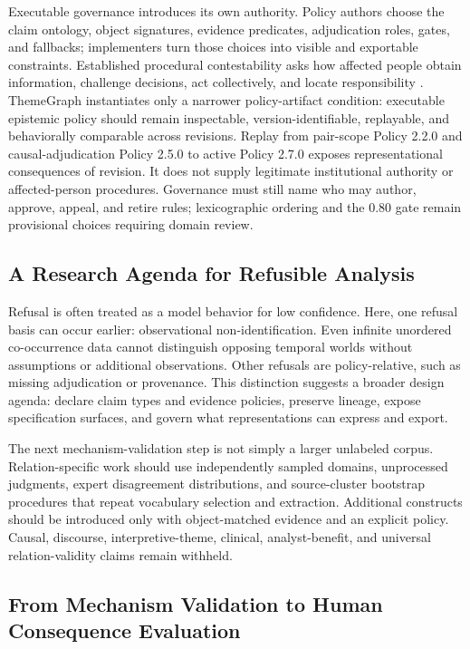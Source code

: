 \documentclass[manuscript,screen,review]{acmart}
\begin{document}
Executable governance introduces its own authority. Policy authors choose the claim ontology, object signatures, evidence predicates, adjudication roles, gates, and fallbacks; implementers turn those choices into visible and exportable constraints. Established procedural contestability asks how affected people obtain information, challenge decisions, act collectively, and locate responsibility \cite{yurrita2025}. ThemeGraph instantiates only a narrower policy-artifact condition: executable epistemic policy should remain inspectable, version-identifiable, replayable, and behaviorally comparable across revisions. Replay from pair-scope Policy 2.2.0 and causal-adjudication Policy 2.5.0 to active Policy 2.7.0 exposes representational consequences of revision. It does not supply legitimate institutional authority or affected-person procedures. Governance must still name who may author, approve, appeal, and retire rules; lexicographic ordering and the 0.80 gate remain provisional choices requiring domain review.

\subsection{A Research Agenda for Refusible Analysis}

Refusal is often treated as a model behavior for low confidence. Here, one refusal basis can occur earlier: observational non-identification. Even infinite unordered co-occurrence data cannot distinguish opposing temporal worlds without assumptions or additional observations. Other refusals are policy-relative, such as missing adjudication or provenance. This distinction suggests a broader design agenda: declare claim types and evidence policies, preserve lineage, expose specification surfaces, and govern what representations can express and export.

The next mechanism-validation step is not simply a larger unlabeled corpus. Relation-specific work should use independently sampled domains, unprocessed judgments, expert disagreement distributions, and source-cluster bootstrap procedures that repeat vocabulary selection and extraction. Additional constructs should be introduced only with object-matched evidence and an explicit policy. Causal, discourse, interpretive-theme, clinical, analyst-benefit, and universal relation-validity claims remain withheld.

\subsection{From Mechanism Validation to Human Consequence Evaluation}
\end{document}

